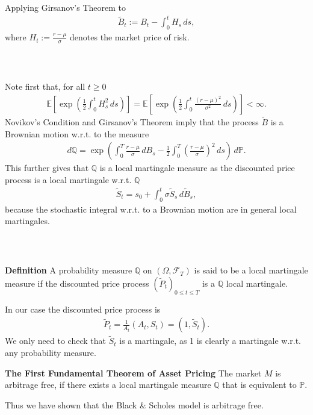 \documentclass{beamer}
\numberwithin{equation}{section}
\newenvironment{frame2}{\begin{frame}\frametitle{{\normalsize \secname} \\ {\large \subsecname}}}{\end{frame}}
\begin{document}
\begin{frame2}
    Applying Girsanov's Theorem to
    \begin{align}
        \tilde{B}_t := B_t - \int_0^t H_s \, ds,
    \end{align}
    where $H_t := \frac{r - \mu}{\sigma}$ denotes the market price of risk.
\end{frame2}

\begin{frame2}
    Note first that, for all $t \geq 0$
    \begin{align*}
        \mathbb{E}\left[\exp\left(\frac{1}{2}\int_0^t H_s^2 \, ds\right)\right] = \mathbb{E}\left[\exp\left(\frac{1}{2}\int_0^t \frac{(r - \mu)^2}{\sigma^2} \, ds\right)\right] < \infty.
    \end{align*}
    Novikov's Condition and Girsanov's Theorem imply that the process $\tilde{B}$ is a Brownian motion w.r.t.\! to the measure
    \begin{align}
        d\mathbb{Q} = \exp\left(\int_0^T \frac{r - \mu}{\sigma}\, dB_s - \frac{1}{2}\int_0^T \left(\frac{r - \mu}{\sigma}\right)^2 \, ds\right) \, d\mathbb{P}.
    \end{align}
    This further gives that $\mathbb{Q}$ is a local martingale measure as the discounted price process is a local martingale w.r.t. $\mathbb{Q}$
    \begin{align}
        \tilde{S}_t = s_0 + \int_0^t\sigma\tilde{S}_s \, d\tilde{B}_s,
    \end{align}
    because the stochastic integral w.r.t.\! to a Brownian motion are in general local martingales. 
\end{frame2}

\begin{frame2}
    \textbf{Definition}\newline
    A probability measure $\mathbb{Q}$ on $(\Omega,\mathscr{F}_T)$ is said to be a local martingale measure if the discounted price process $(\tilde{P}_t)_{0\leq t \leq T}$ is a $\mathbb{Q}$ local martingale.
    \vspace{10pt}

    In our case the discounted price process is
    \begin{align*}
        \tilde{P}_t = \frac{1}{A_t}\left(A_t, S_t\right) = \left(1, \tilde{S}_t\right).
    \end{align*}
    \begingroup
    \footnotesize
    \color{gray}
    We only need to check that $\tilde{S}_t$ is a martingale, as 1 is clearly a martingale w.r.t.\! any probability measure.
    \endgroup

    \textbf{The First Fundamental Theorem of Asset Pricing}\newline
    The market $M$ is arbitrage free, if there exists a local martingale measure $\mathbb{Q}$ that is equivalent to $\mathbb{P}$.

    \vspace{10pt}
    Thus we have shown that the Black \& Scholes model is arbitrage free.
\end{frame2}
\end{document}
